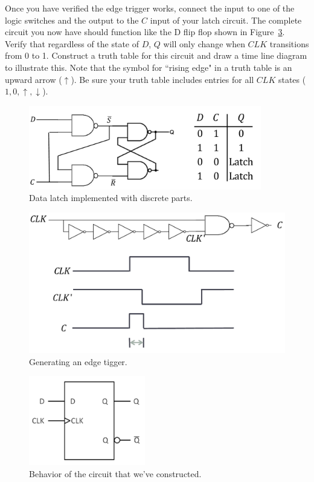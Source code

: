 \documentclass[12pt]{article}
\begin{document}
Once you have verified the edge trigger works, connect the input to one of the logic switches and the output
to the $C$ input of your latch circuit.  
The complete circuit you now have should function like  the  D flip flop shown in Figure~\ref{fig:d-latch-part}. Verify 
that regardless of the state of $D$, $Q$ will only change when $CLK$ transitions from 0 to 1.
Construct a truth table for this circuit and draw a time line diagram to illustrate this.  Note that the symbol for ``rising edge" 
in a truth table is an upward arrow ($\uparrow$).  Be sure your truth table includes entries for all $CLK$ states ($1,0,\uparrow,\downarrow$).

\begin{figure}[!h]
\centerline{\includegraphics[width=4in]{figs/d-latch.pdf}}
\caption{Data latch implemented with discrete parts.}
\label{fig:d-latch}
\end{figure}

\begin{figure}[!h]
\centerline{\includegraphics[width=5in]{figs/edge.pdf}}
\caption{Generating an edge tigger.}
\label{fig:edge}
\end{figure}

\begin{figure}[!h]
\centerline{\includegraphics[width=2in]{figs/d-latch-part.pdf}}
\caption{Behavior of the circuit that we've constructed.}
\label{fig:d-latch-part}
\end{figure}
\end{document}
